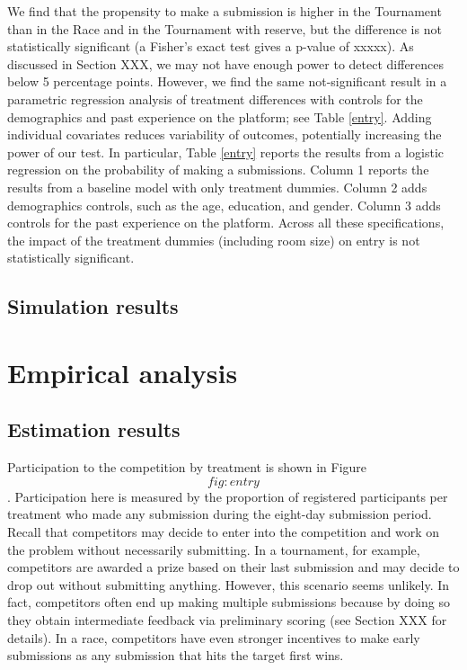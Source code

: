 \documentclass[12pt,]{article}
\theoremstyle{plain} %
\begin{document}
We find that the propensity to make a submission is higher in the
Tournament than in the Race and in the Tournament with reserve, but the
difference is not statistically significant (a Fisher's exact test gives
a p-value of xxxxx). As discussed in Section XXX, we may not have enough
power to detect differences below 5 percentage points. However, we find
the same not-significant result in a parametric regression analysis of
treatment differences with controls for the demographics and past
experience on the platform; see Table \ref{entry}. Adding individual
covariates reduces variability of outcomes, potentially increasing the
power of our test. In particular, Table \ref{entry} reports the results
from a logistic regression on the probability of making a submissions.
Column 1 reports the results from a baseline model with only treatment
dummies. Column 2 adds demographics controls, such as the age,
education, and gender. Column 3 adds controls for the past experience on
the platform. Across all these specifications, the impact of the
treatment dummies (including room size) on entry is not statistically
significant.

\subsection{Simulation results}\label{simulation-results}

\section{Empirical analysis}\label{empirical-analysis}

\subsection{Estimation results}\label{estimation-results-1}

Participation to the competition by treatment is shown in Figure
\[fig:entry\]. Participation here is measured by the proportion of
registered participants per treatment who made any submission during the
eight-day submission period. Recall that competitors may decide to enter
into the competition and work on the problem without necessarily
submitting. In a tournament, for example, competitors are awarded a
prize based on their last submission and may decide to drop out without
submitting anything. However, this scenario seems unlikely. In fact,
competitors often end up making multiple submissions because by doing so
they obtain intermediate feedback via preliminary scoring (see Section
XXX for details). In a race, competitors have even stronger incentives
to make early submissions as any submission that hits the target first
wins.
\end{document}

